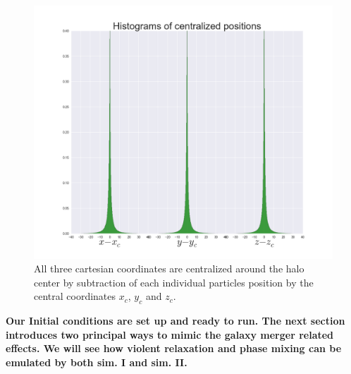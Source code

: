 \begin{figure}[!htbp]
\centering
\includegraphics[width=1.0\linewidth]{img/Fig_x_hist.png}
\caption{All three cartesian coordinates are centralized around the halo center by subtraction of each individual particles position by the central coordinates $x_c$, $y_c$ and $z_c$.}
\label{fig:test}
\end{figure}

\textbf{Our Initial conditions are set up and ready to run. The next section introduces two principal ways to mimic the galaxy merger related effects. We will see how violent relaxation and phase mixing can be emulated by both sim. I and sim. II.}

